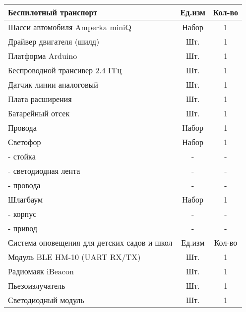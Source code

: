 \begin{tabular}{|p{10cm}|c|c|}   
    \hline
    Беспилотный транспорт & Ед.изм & Кол-во		 \\
    \hline
    Шасси автомобиля Amperka miniQ & Набор & 1 \\
    Драйвер двигателя (шилд) & Шт. & 1 \\
    Платформа Arduino & Шт. & 1 \\
    Беспроводной трансивер 2.4 ГГц & Шт. & 1 \\
    Датчик линии аналоговый & Шт. & 1 \\
    Плата расширения & Шт. & 1 \\
    Батарейный отсек & Шт. & 1 \\
    Провода & Набор & 1	 \\
    Светофор & Набор & 1 \\
    - стойка & - & - \\
    - светодиодная лента & - & - \\
    - провода & - & - \\
    Шлагбаум & Набор & 1 \\
    - корпус & - & - \\
    - привод & - & - \\
    \hline
    \hline
    Система оповещения для детских садов и школ	& Ед.изм & Кол-во		 \\
    \hline
    Модуль BLE HM-10 (UART RX/TX) & Шт. & 1 \\
    Радиомаяк iBeacon & Шт. & 1 \\
    Пьезоизлучатель & Шт. & 1 \\
    Светодиодный модуль & Шт. & 1 \\
    \hline

\end{tabular}

